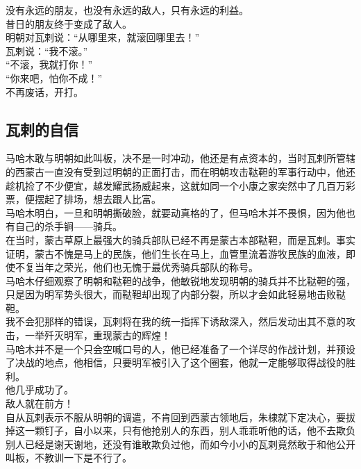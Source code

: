 \begin{multicols}{\theparacolNo}
没有永远的朋友，也没有永远的敌人，只有永远的利益。\\

昔日的朋友终于变成了敌人。\\

明朝对瓦剌说：“从哪里来，就滚回哪里去！”\\

瓦剌说：“我不滚。”\\

“不滚，我就打你！”\\

“你来吧，怕你不成！”\\

不再废话，开打。\\

\subsection{瓦剌的自信}
马哈木敢与明朝如此叫板，决不是一时冲动，他还是有点资本的，当时瓦剌所管辖的西蒙古一直没有受到过明朝的正面打击，而在明朝攻击鞑靼的军事行动中，他还趁机捡了不少便宜，越发耀武扬威起来，这就如同一个小康之家突然中了几百万彩票，便摆起了排场，想去跟人比富。\\

马哈木明白，一旦和明朝撕破脸，就要动真格的了，但马哈木并不畏惧，因为他也有自己的杀手锏——骑兵。\\

在当时，蒙古草原上最强大的骑兵部队已经不再是蒙古本部鞑靼，而是瓦剌。事实证明，蒙古不愧是马上的民族，他们生长在马上，血管里流着游牧民族的血液，即使不复当年之荣光，他们也无愧于最优秀骑兵部队的称号。\\

马哈木仔细观察了明朝和鞑靼的战争，他敏锐地发现明朝的骑兵并不比鞑靼的强，只是因为明军势头很大，而鞑靼却出现了内部分裂，所以才会如此轻易地击败鞑靼。\\

我不会犯那样的错误，瓦剌将在我的统一指挥下诱敌深入，然后发动出其不意的攻击，一举歼灭明军，重现蒙古的辉煌！\\

马哈木并不是一个只会空喊口号的人，他已经准备了一个详尽的作战计划，并预设了决战的地点，他相信，只要明军被引入了这个圈套，他就一定能够取得战役的胜利。\\

他几乎成功了。\\

敌人就在前方！\\

自从瓦剌表示不服从明朝的调遣，不肯回到西蒙古领地后，朱棣就下定决心，要拔掉这一颗钉子，自小以来，只有他抢别人的东西，别人乖乖听他的话，他不去欺负别人已经是谢天谢地，还没有谁敢欺负过他，而如今小小的瓦剌竟然敢于和他公开叫板，不教训一下是不行了。\\


\end{multicols}
